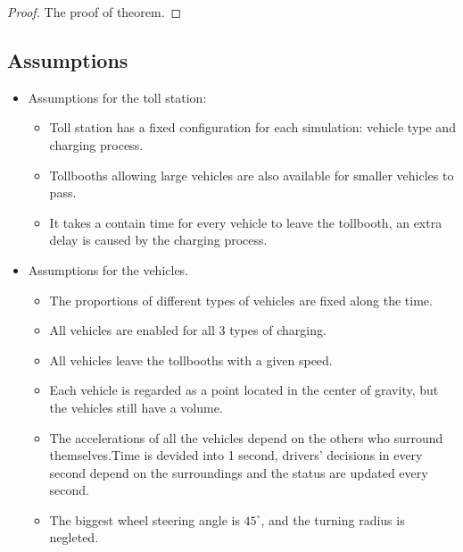 \documentclass{mcmthesis}
\begin{document}
\begin{Theorem} \label{thm:latex}

\end{Theorem}

\begin{Lemma} \label{thm:tex}

\end{Lemma}

\begin{proof}
The proof of theorem.
\end{proof}

\subsection{Assumptions}

\begin{itemize}
	\item Assumptions for the toll station:
	\begin{itemize}
         \item Toll station has a fixed configuration for each simulation: vehicle type and charging process.
         \item Tollbooths allowing large vehicles are also available for smaller vehicles to pass.
       	 \item It takes a contain time for every vehicle to leave the tollbooth, an extra delay is caused by the charging process.
	\end{itemize}

    \item Assumptions for the vehicles.
    \begin{itemize}
    	\item The proportions of different types of vehicles are fixed along the time.
    	\item All vehicles are enabled for all 3 types of charging.
    	\item All vehicles leave the tollbooths with a given speed.
    	\item Each vehicle is regarded as a point located in the center of gravity, but the vehicles still have a volume.
    	\item The accelerations of all the vehicles depend on the others who surround themselves.Time is devided into 1 second, drivers' decisions in every second depend on the surroundings and the status are updated every second.
    	\item The biggest wheel steering angle is $45^{\circ}$, and the turning radius is negleted.
    	

\end{itemize}
\end{itemize}
\end{document}
